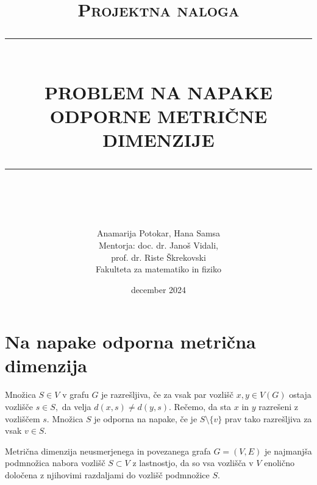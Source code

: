\documentclass[12pt]{article}
\newcommand{\HRule}[1]{\rule{\linewidth}{#1}}
\begin{document}
\title{ \normalsize \textsc{Projektna naloga}
		\\ [2.0cm]
		\HRule{0.5pt} \\
		\LARGE \textbf{\uppercase{Problem na napake odporne metrične dimenzije}}
		\HRule{2pt} \\ [0.5cm]
		\normalsize \date{december 2024} \vspace*{5\baselineskip}}
\author{
		Anamarija Potokar, Hana Samsa 
        \vspace{1 cm} \\
		Mentorja: doc. dr. Janoš Vidali, \\
        prof. dr. Riste Škrekovski 
        \vspace{1 cm} \\
		Fakulteta za matematiko in fiziko }

\maketitle

\newpage

\section{Na napake odporna metrična dimenzija}

Množica $S \in V$ v grafu $G$ je razrešljiva, če za vsak par vozlišč $x, y \in V(G)$ 
ostaja vozlišče $s \in S,$ da velja $d(x, s) \neq d(y, s).$ Rečemo, da sta $x$ in $y$
razrešeni z vozliščem $s$. Množica $S$ je odporna na napake, če je 
$S \setminus \{v\}$ prav tako razrešljiva za vsak $v \in S.$ 

Metrična dimenzija neusmerjenega in povezanega grafa $G = (V, E)$ je najmanjša 
podmnožica nabora vozlišč $S \subset V$ z lastnostjo, da so vsa vozlišča v $V$ 
enolično določena z njihovimi razdaljami do vozlišč podmnožice $S$.

\end{document}
